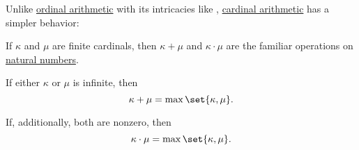\begin{proposition}\label{thm:simplified_cardinal_arithmetic}
  Unlike \hyperref[def:ordinal_arithmetic]{ordinal arithmetic} with its intricacies like , \hyperref[def:cardinal_arithmetic]{cardinal arithmetic} has a simpler behavior:
  \begin{thmenum}
     If \( \kappa \) and \( \mu \) are finite cardinals, then \( \kappa + \mu \) and \( \kappa \cdot \mu \) are the familiar operations on \hyperref[def:natural_numbers]{natural numbers}.

     If either \( \kappa \) or \( \mu \) is infinite, then
    \begin{equation*}
      \kappa + \mu = \max\set{ \kappa, \mu }.
    \end{equation*}

    If, additionally, both are nonzero, then
    \begin{equation*}
      \kappa \cdot \mu = \max\set{ \kappa, \mu }.
    \end{equation*}
  \end{thmenum}
\end{proposition}
